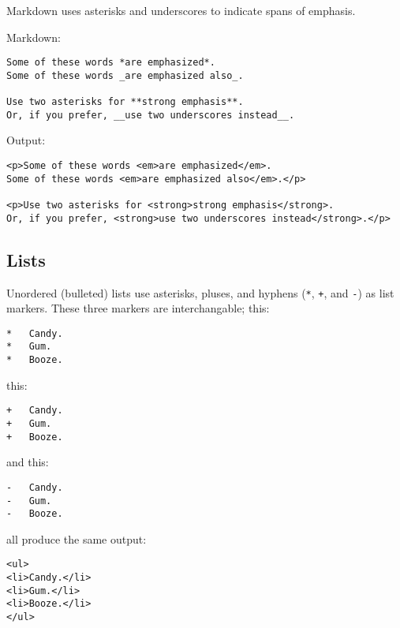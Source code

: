 Markdown uses asterisks and underscores to indicate spans of emphasis.



Markdown:

\begin{lstlisting}
Some of these words *are emphasized*.
Some of these words _are emphasized also_.

Use two asterisks for **strong emphasis**.
Or, if you prefer, __use two underscores instead__.
\end{lstlisting}




Output:

\begin{lstlisting}
<p>Some of these words <em>are emphasized</em>.
Some of these words <em>are emphasized also</em>.</p>

<p>Use two asterisks for <strong>strong emphasis</strong>.
Or, if you prefer, <strong>use two underscores instead</strong>.</p>
\end{lstlisting}


\subsection*{Lists}




Unordered (bulleted) lists use asterisks, pluses, and hyphens (\texttt{*},
\texttt{+}, and \texttt{-}) as list markers. These three markers are
interchangable; this:

\begin{lstlisting}
*   Candy.
*   Gum.
*   Booze.
\end{lstlisting}




this:

\begin{lstlisting}
+   Candy.
+   Gum.
+   Booze.
\end{lstlisting}




and this:

\begin{lstlisting}
-   Candy.
-   Gum.
-   Booze.
\end{lstlisting}




all produce the same output:

\begin{lstlisting}
<ul>
<li>Candy.</li>
<li>Gum.</li>
<li>Booze.</li>
</ul>
\end{lstlisting}




